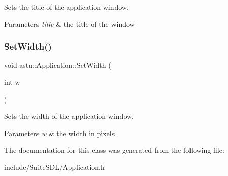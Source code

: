 Sets the title of the application window.


\begin{DoxyParams}{Parameters}
{\em title} & the title of the window \\
\hline
\end{DoxyParams}
\mbox{\label{classastu_1_1Application_a6d991cdd5263dd9d1a08218c84e70a24}} 
\subsubsection{\texorpdfstring{Set\+Width()}{SetWidth()}}
{\footnotesize\ttfamily void astu\+::\+Application\+::\+Set\+Width (\begin{DoxyParamCaption}\item[{int}]{w }\end{DoxyParamCaption})}

Sets the width of the application window.


\begin{DoxyParams}{Parameters}
{\em w} & the width in pixels \\
\hline
\end{DoxyParams}


The documentation for this class was generated from the following file\+:\begin{DoxyCompactItemize}
\item 
include/\+Suite\+S\+D\+L/Application.\+h\end{DoxyCompactItemize}
